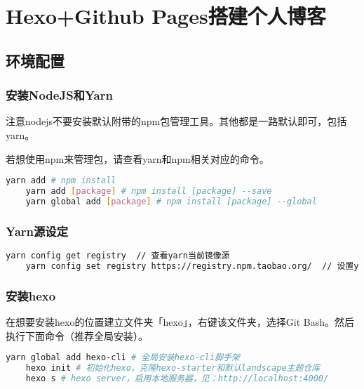 \chapter{Hexo+Github Pages搭建个人博客}

\section{环境配置}
\subsection{安装NodeJS和Yarn}
注意nodejs不要安装默认附带的npm包管理工具。其他都是一路默认即可，包括yarn。

若想使用npm来管理包，请查看yarn和npm相关对应的命令。
\begin{lstlisting}[language={bash},title={yarn和npm对应命令}]
    yarn add # npm install
    yarn add [package] # npm install [package] --save
    yarn global add [package] # npm install [package] --global
\end{lstlisting}


\subsection{Yarn源设定}
\begin{lstlisting}[language={bash},title={\textsf{Yarn源设定命令}}]
    yarn config get registry  // 查看yarn当前镜像源
    yarn config set registry https://registry.npm.taobao.org/  // 设置yarn镜像源为淘宝镜像
\end{lstlisting}

\subsection{安装hexo}
在想要安装hexo的位置建立文件夹「hexo」，右键该文件夹，选择Git Bash。然后执行下面命令（推荐全局安装）。


\begin{lstlisting}[language={bash},title={全局安装hexo}]
    yarn global add hexo-cli # 全局安装hexo-cli脚手架
    hexo init # 初始化hexo，克隆hexo-starter和默认landscape主题仓库
    hexo s # hexo server，启用本地服务器，见：http://localhost:4000/
\end{lstlisting}


